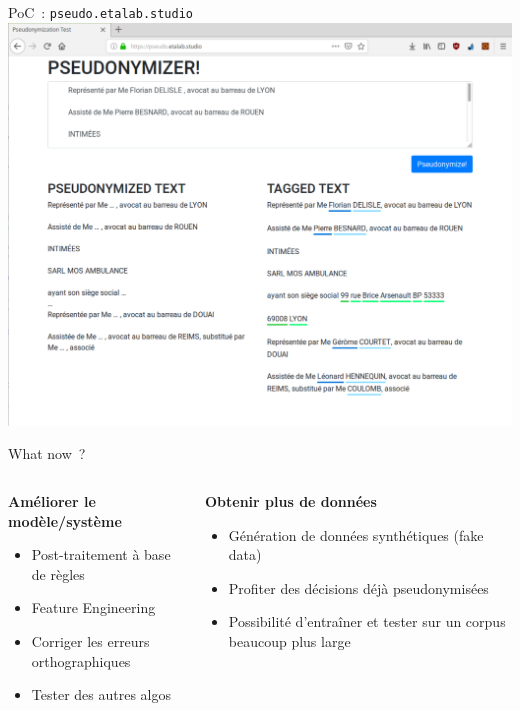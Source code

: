 \documentclass[10pt]{beamer}
\begin{document}
\begin{frame}{PoC~: \texttt{pseudo.etalab.studio}}
\includegraphics[width=1\linewidth]{"img/pseudo"}
\end{frame}

\begin{frame}{What now~?}
\begin{columns}[T,onlytextwidth]
\begin{alertblock}{\textbf{Améliorer le modèle/système}}
	\begin{itemize}

		\item {Post-traitement à base de règles} %
		\item {Feature Engineering} %
		\item Corriger les erreurs orthographiques
		\item {Tester des autres algos} %
	\end{itemize}
\end{alertblock}	
\begin{alertblock}{\textbf{Obtenir plus de données}}
	\begin{itemize}
		\item Génération de données synthétiques (fake data)
		\item Profiter des décisions déjà pseudonymisées
		\item Possibilité d'entraîner et tester sur un corpus beaucoup plus large
	\end{itemize}
\end{alertblock}
\end{columns}
\end{frame}
\end{document}

